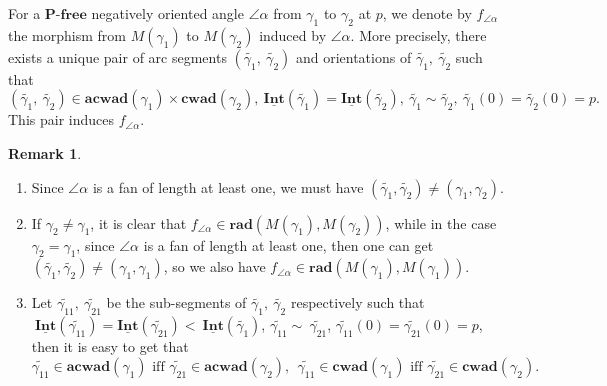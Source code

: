 \documentclass[a4paper,10pt]{amsart}
\theoremstyle{plain}          %
\theoremstyle{definition}
\newtheorem{rk}[theorem]{Remark}
\def\PP{\mathbf{P}}
\newcommand{\Intv}{\underline{\mathbf{Int}}}
\newcommand{\aad}{\mathbf{acwad}}
\newcommand{\cad}{\mathbf{cwad}}
\begin{document}
For a $\PP$-$\mathbf{free}$ negatively oriented angle $\angle\alpha$ from $\gamma_1$ to $\gamma_2$ at $p$, we denote by $f_{\angle\alpha}$ the  morphism from $M(\gamma_1)$ to $M(\gamma_2)$ induced by $\angle\alpha$. More precisely, there exists a unique pair of arc segments $(\widetilde{\gamma_{1}},~\widetilde{\gamma_{2}})$ and orientations of  $\widetilde{\gamma_{1}},~\widetilde{\gamma_{2}}$  such that 
\[(\widetilde{\gamma_{1}},~\widetilde{\gamma_{2}})\in\aad(\gamma_1)\times\cad(\gamma_2), ~\Intv(\widetilde{\gamma_{1}})=\Intv(\widetilde{\gamma_{2}}), ~\widetilde{\gamma_{1}}\sim\widetilde{\gamma_{2}}, ~\widetilde{\gamma_{1}}(0)=\widetilde{\gamma_{2}}(0)=p.\]
This pair induces $f_{\angle\alpha}$.
\begin{rk}
   \begin{enumerate}
   \item  Since $\angle\alpha$ is a fan of length at least one, we must have $(\widetilde{\gamma_{1}}, \widetilde{\gamma_{2}})\neq  (\gamma_1,\gamma_2)$.
       \item If $\gamma_2\neq \gamma_1$, it is clear that $f_{\angle\alpha}\in\mathbf{rad} (M(\gamma_1),M(\gamma_2))$, while in the case $\gamma_2=\gamma_1$, since $\angle\alpha$ is a fan of length at least one, then one can get $(\widetilde{\gamma_{1}}, \widetilde{\gamma_{2}})\neq  (\gamma_1,\gamma_1)$, so we also have 
 $f_{\angle\alpha}\in\mathbf{rad} (M(\gamma_1),M(\gamma_1))$. 
\item Let $\widetilde{\gamma_{11}},~\widetilde{\gamma_{21}}$ be the sub-segments of $\widetilde{\gamma_{1}},~\widetilde{\gamma_{2}}$ respectively such that $~\Intv(\widetilde{\gamma_{11}})=\Intv(\widetilde{\gamma_{21}})<~\Intv(\widetilde{\gamma_{1}}) $, $\widetilde{\gamma_{11}}\sim~\widetilde{\gamma_{21}}$,  $\widetilde{\gamma_{11}}(0)=\widetilde{\gamma_{21}}(0)=p$, then it is easy to get that  $$\widetilde{\gamma_{11}}\in \aad(\gamma_1) \text{ iff  }\widetilde{\gamma_{21}}\in \aad(\gamma_2),\ \   \widetilde{\gamma_{11}}\in \cad(\gamma_1) \text{ iff }\widetilde{\gamma_{21}}\in \cad(\gamma_2).$$ 
   \end{enumerate} 
\end{rk}
\end{document}
